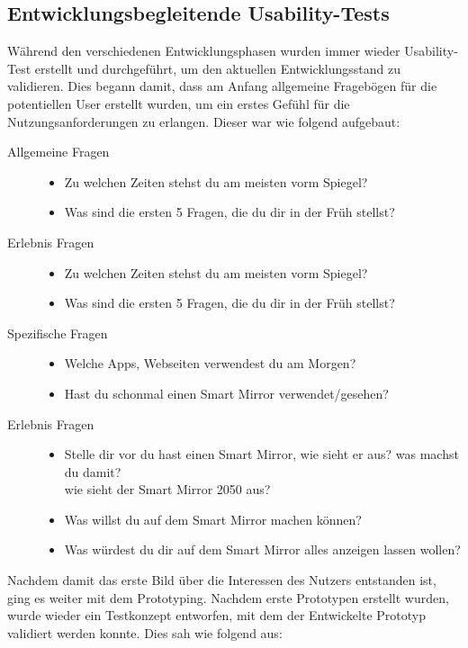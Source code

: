 \documentclass[12pt, a4paper]{scrartcl}
\begin{document}
	\subsection{Entwicklungsbegleitende Usability-Tests}
	Während den verschiedenen Entwicklungsphasen wurden immer wieder Usability-Test erstellt und durchgeführt, um den aktuellen Entwicklungsstand zu validieren.
	Dies begann damit, dass am Anfang allgemeine Fragebögen für die potentiellen User erstellt wurden, um ein erstes Gefühl für die 						Nutzungsanforderungen zu erlangen. Dieser war wie folgend aufgebaut:
	\begin{description}
		\item[Allgemeine Fragen] \hfill
		 \begin{itemize}
			\setlength{\itemsep}{-0.5em}
			\item Zu welchen Zeiten stehst du am meisten vorm Spiegel?
			\item Was sind die ersten 5 Fragen, die du dir in der Früh stellst?
		\end{itemize}
		\item[Erlebnis Fragen] \hfill
		\begin{itemize}
			\setlength{\itemsep}{-0.5em}
			\item Zu welchen Zeiten stehst du am meisten vorm Spiegel?
			\item Was sind die ersten 5 Fragen, die du dir in der Früh stellst?
		\end{itemize}
		\item[Spezifische Fragen] \hfill
			\begin{itemize}
			\setlength{\itemsep}{-0.5em}
			\item Welche Apps, Webseiten verwendest du am Morgen?
			\item Hast du schonmal einen Smart Mirror verwendet/gesehen?
			\end{itemize}
		\item[Erlebnis Fragen] \hfill
			\begin{itemize}
			\setlength{\itemsep}{-0.5em}
			\item Stelle dir vor du hast einen Smart Mirror, wie sieht er aus? was machst du damit?\\
			wie sieht der Smart Mirror 2050 aus?
			\item Was willst du auf dem Smart Mirror machen können?
			\item Was würdest du dir auf dem Smart Mirror alles anzeigen lassen wollen?
			\end{itemize}
	\end{description}
	Nachdem damit das erste Bild über die Interessen des Nutzers entstanden ist, ging es weiter mit dem Prototyping. Nachdem erste Prototypen 				erstellt wurden, wurde wieder ein Testkonzept entworfen, mit dem der Entwickelte Prototyp validiert werden konnte. Dies sah wie folgend aus:
\end{document}

